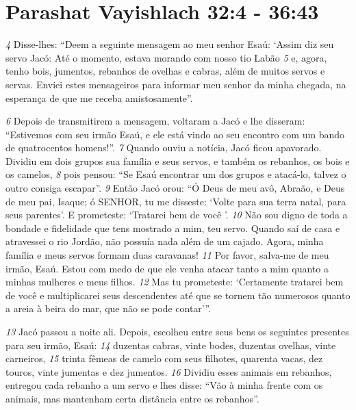 \section*{Parashat Vayishlach 32:4 - 36:43}

\textit{\tiny 4}
Disse-lhes: “Deem a seguinte mensagem ao meu
senhor Esaú: ‘Assim diz seu servo Jacó: Até o momento, estava morando com
nosso tio Labão 
\textit{\tiny 5}
e, agora, tenho bois, jumentos, rebanhos de ovelhas e cabras,
além de muitos servos e servas. Enviei estes mensageiros para informar meu
senhor da minha chegada, na esperança de que me receba amistosamente”.

\bigskip
\textit{\tiny 6}
Depois de transmitirem a mensagem, voltaram a Jacó e lhe disseram:
“Estivemos com seu irmão Esaú, e ele está vindo ao seu encontro com um bando
de quatrocentos homens!”. 
\textit{\tiny 7}
Quando ouviu a notícia, Jacó ficou apavorado. Dividiu
em dois grupos sua família e seus servos, e também os rebanhos, os bois e os
camelos, 
\textit{\tiny 8}
pois pensou: “Se Esaú encontrar um dos grupos e atacá-lo, talvez o
outro consiga escapar”.
\textit{\tiny 9}
Então Jacó orou: “Ó Deus de meu avô, Abraão, e Deus de meu pai, Isaque; ó
SENHOR, tu me disseste: ‘Volte para sua terra natal, para seus parentes’. E
prometeste: ‘Tratarei bem de você ’. 
\textit{\tiny 10}
Não sou digno de toda a bondade e
fidelidade que tens mostrado a mim, teu servo. Quando saí de casa e atravessei o
rio Jordão, não possuía nada além de um cajado. Agora, minha família e meus
servos formam duas caravanas! 
\textit{\tiny 11}
Por favor, salva-me de meu irmão, Esaú. Estou
com medo de que ele venha atacar tanto a mim quanto a minhas mulheres e meus
filhos. 
\textit{\tiny 12}
Mas tu prometeste: ‘Certamente tratarei bem de você e multiplicarei seus
descendentes até que se tornem tão numerosos quanto a areia à beira do mar, que
não se pode contar’”.
   
\bigskip
\textit{\tiny 13}
Jacó passou a noite ali. Depois, escolheu entre seus bens os seguintes
presentes para seu irmão, Esaú: 
\textit{\tiny 14}
duzentas cabras, vinte bodes, duzentas ovelhas,
vinte carneiros, 
\textit{\tiny 15}
trinta fêmeas de camelo com seus filhotes, quarenta vacas, dez
touros, vinte jumentas e dez jumentos. 
\textit{\tiny 16}
Dividiu esses animais em rebanhos,
entregou cada rebanho a um servo e lhes disse: “Vão à minha frente com os
animais, mas mantenham certa distância entre os rebanhos”.
   
